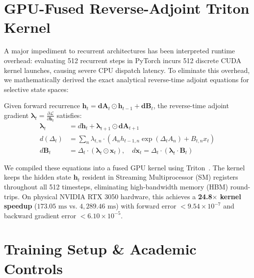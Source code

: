 \documentclass[10pt,twocolumn,letterpaper]{article}
\begin{document}
\section{GPU-Fused Reverse-Adjoint Triton Kernel}
\label{sec:triton}

A major impediment to recurrent architectures has been interpreted runtime overhead: evaluating 512 recurrent steps in PyTorch incurs 512 discrete CUDA kernel launches, causing severe CPU dispatch latency. To eliminate this overhead, we mathematically derived the exact analytical reverse-time adjoint equations for selective state spaces:

Given forward recurrence $\mathbf{h}_t = \mathbf{dA}_t \odot \mathbf{h}_{t-1} + \mathbf{dB}_t$, the reverse-time adjoint gradient $\boldsymbol{\lambda}_t = \frac{\partial \mathcal{L}}{\partial \mathbf{h}_t}$ satisfies:
\begin{align}
    \boldsymbol{\lambda}_t &= d\mathbf{h}_t + \boldsymbol{\lambda}_{t+1} \odot \mathbf{dA}_{t+1} \\
    d(\Delta_t) &= \sum_n \lambda_{t, n} \cdot \left(A_n h_{t-1, n} \exp(\Delta_t A_n) + B_{t, n} x_t\right) \\
    d\mathbf{B}_t &= \Delta_t \cdot (\boldsymbol{\lambda}_t \odot \mathbf{x}_t), \quad d\mathbf{x}_t = \Delta_t \cdot (\boldsymbol{\lambda}_t \cdot \mathbf{B}_t)
\end{align}

We compiled these equations into a fused GPU kernel using Triton~\cite{tillet2019triton}. The kernel keeps the hidden state $\mathbf{h}_t$ resident in Streaming Multiprocessor (SM) registers throughout all 512 timesteps, eliminating high-bandwidth memory (HBM) round-trips. On physical NVIDIA RTX 3050 hardware, this achieves a \textbf{24.8$\times$ kernel speedup} ($173.05\text{ ms}$ vs. $4,289.46\text{ ms}$) with forward error $< 9.54 \times 10^{-7}$ and backward gradient error $< 6.10 \times 10^{-5}$.

\section{Training Setup \& Academic Controls}
\label{sec:setup}
\end{document}
